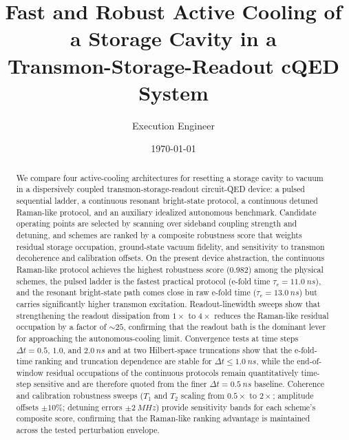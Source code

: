 \documentclass[aps,pra,twocolumn,reprint,floatfix,amsmath,amssymb]{revtex4-2}
\begin{document}
\title{Fast and Robust Active Cooling of a Storage Cavity in a\\Transmon-Storage-Readout cQED System}
\author{Execution Engineer}
\date{\today}

\begin{abstract}
We compare four active-cooling architectures for resetting a storage cavity to vacuum in a dispersively coupled transmon-storage-readout circuit-QED device: a pulsed sequential ladder, a continuous resonant bright-state protocol, a continuous detuned Raman-like protocol, and an auxiliary idealized autonomous benchmark.
Candidate operating points are selected by scanning over sideband coupling strength and detuning, and schemes are ranked by a composite robustness score that weights residual storage occupation, ground-state vacuum fidelity, and sensitivity to transmon decoherence and calibration offsets.
On the present device abstraction, the continuous Raman-like protocol achieves the highest robustness score ($0.982$) among the physical schemes, the pulsed ladder is the fastest practical protocol (e-fold time $\tau_e = \SI{11.0}{ns}$), and the resonant bright-state path comes close in raw e-fold time ($\tau_e = \SI{13.0}{ns}$) but carries significantly higher transmon excitation.
Readout-linewidth sweeps show that strengthening the readout dissipation from $1\times$ to $4\times$ reduces the Raman-like residual occupation by a factor of ${\sim}25$, confirming that the readout bath is the dominant lever for approaching the autonomous-cooling limit.
Convergence tests at time steps $\Delta t = 0.5$, $1.0$, and $\SI{2.0}{ns}$ and at two Hilbert-space truncations show that the e-fold-time ranking and truncation dependence are stable for $\Delta t \leq \SI{1.0}{ns}$, while the end-of-window residual occupations of the continuous protocols remain quantitatively time-step sensitive and are therefore quoted from the finer $\Delta t = \SI{0.5}{ns}$ baseline.
Coherence and calibration robustness sweeps ($T_1$ and $T_2$ scaling from $0.5\times$ to $2\times$; amplitude offsets $\pm 10\%$; detuning errors $\pm\SI{2}{MHz}$) provide sensitivity bands for each scheme's composite score, confirming that the Raman-like ranking advantage is maintained across the tested perturbation envelope.
\end{abstract}

\maketitle
\end{document}
